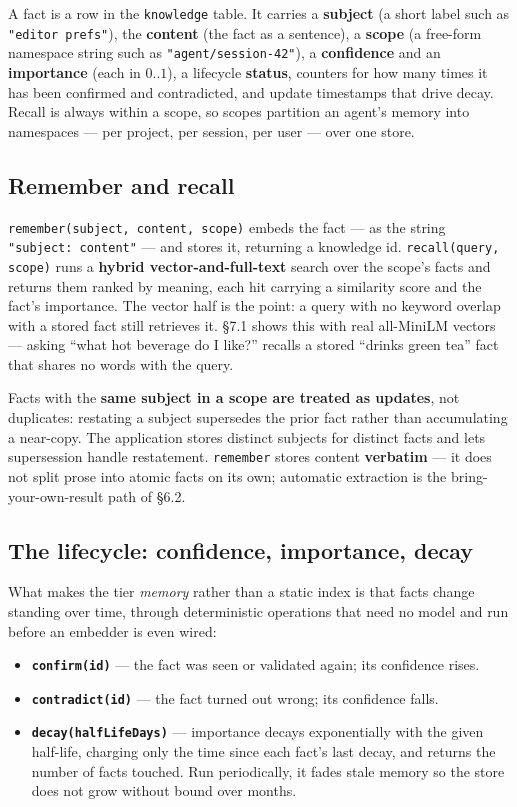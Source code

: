\documentclass[11pt]{article}
\newcommand{\code}[1]{\texttt{#1}}
\begin{document}
A fact is a row in the \code{knowledge} table. It carries a \textbf{subject} (a
short label such as \code{"editor prefs"}), the \textbf{content} (the fact as a
sentence), a \textbf{scope} (a free-form namespace string such as
\code{"agent/session-42"}), a \textbf{confidence} and an \textbf{importance} (each
in $0..1$), a lifecycle \textbf{status}, counters for how many times it has been
confirmed and contradicted, and update timestamps that drive decay. Recall is
always within a scope, so scopes partition an agent's memory into namespaces ---
per project, per session, per user --- over one store.

\subsection{Remember and recall}

\code{remember(subject, content, scope)} embeds the fact --- as the string
\code{"subject: content"} --- and stores it, returning a knowledge id.
\code{recall(query, scope)} runs a \textbf{hybrid vector-and-full-text} search
over the scope's facts and returns them ranked by meaning, each hit carrying a
similarity score and the fact's importance. The vector half is the point: a query
with no keyword overlap with a stored fact still retrieves it. \S7.1 shows this
with real all-MiniLM vectors --- asking ``what hot beverage do I like?'' recalls a
stored ``drinks green tea'' fact that shares no words with the query.

Facts with the \textbf{same subject in a scope are treated as updates}, not
duplicates: restating a subject supersedes the prior fact rather than accumulating
a near-copy. The application stores distinct subjects for distinct facts and lets
supersession handle restatement. \code{remember} stores content \textbf{verbatim}
--- it does not split prose into atomic facts on its own; automatic extraction is
the bring-your-own-result path of \S6.2.

\subsection{The lifecycle: confidence, importance, decay}

What makes the tier \emph{memory} rather than a static index is that facts change
standing over time, through deterministic operations that need no model and run
before an embedder is even wired:
\begin{itemize}[leftmargin=1.4em,itemsep=0.2em]
  \item \textbf{\code{confirm(id)}} --- the fact was seen or validated again; its
    confidence rises.
  \item \textbf{\code{contradict(id)}} --- the fact turned out wrong; its
    confidence falls.
  \item \textbf{\code{decay(halfLifeDays)}} --- importance decays exponentially
    with the given half-life, charging only the time since each fact's last decay,
    and returns the number of facts touched. Run periodically, it fades stale
    memory so the store does not grow without bound over months.
\end{itemize}
\end{document}
